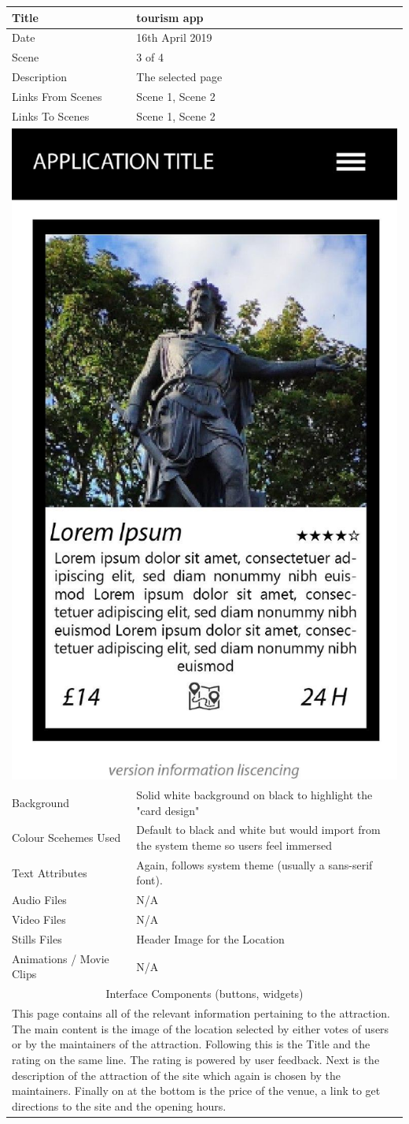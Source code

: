 \hspace{-1cm}
	\centering
	\begin{tabular}{p{4cm}p{10cm}}
		\hline
		Title & tourism app \\
		\hline
		Date & 16th April 2019 \\
		\hline
		Scene & 3 of 4 \\
		\hline
		Description & The selected page \\
		\hline
		Links From Scenes & Scene 1, Scene 2 \\
		\hline
		Links To Scenes & Scene 1, Scene 2 \\
		\hline
		\multicolumn{2}{c}{\includegraphics[width=0.5\linewidth]{images/screen2.jpg}} \\
		\hline
		Background & Solid white background on black to highlight the "card design" \\
		\hline
		Colour Scehemes Used & Default to black and white but would import from the system theme so users feel immersed \\
		\hline
		Text Attributes & Again, follows system theme (usually a sans-serif font). \\
		\hline
		Audio Files & N/A \\
		\hline
		Video Files & N/A \\
		\hline
		Stills Files & Header Image for the Location \\
		\hline
		Animations / Movie Clips & N/A \\
		\hline
		\multicolumn{2}{c}{Interface Components (buttons, widgets)} \\
		\hline
		\multicolumn{2}{p{14cm}}{This page contains all of the relevant information pertaining to the attraction. The main content is the image of the location selected by either votes of users or by the maintainers of the attraction. Following this is the Title and the rating on the same line. The rating is powered by user feedback. Next is the description of the attraction of the site which again is chosen by the maintainers. Finally on at the bottom is the price of the venue, a link to get directions to the site and the opening hours.} \\
		\hline
	\end{tabular}
